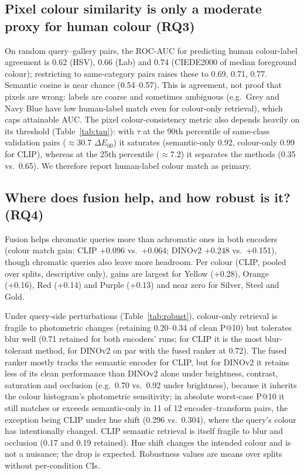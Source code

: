 \documentclass[11pt]{article}
\begin{document}
\subsection{Pixel colour similarity is only a moderate proxy for human colour (RQ3)}\label{sec:metric}

On random query--gallery pairs, the ROC-AUC for predicting human colour-label agreement is 0.62 (HSV), 0.66 (Lab) and 0.74 (CIEDE2000 of median foreground colour); restricting to same-category pairs raises these to 0.69, 0.71, 0.77. Semantic cosine is near chance (0.54--0.57). This is agreement, not proof that pixels are wrong: labels are coarse and sometimes ambiguous (e.g.\ Grey and Navy Blue have low human-label match even for colour-only retrieval), which caps attainable AUC. The pixel colour-consistency metric also depends heavily on its threshold (Table~\ref{tab:tau}): with $\tau$ at the 90th percentile of same-class validation pairs ($\approx$30.7 $\Delta E_{00}$) it saturates (semantic-only 0.92, colour-only 0.99 for CLIP), whereas at the 25th percentile ($\approx$7.2) it separates the methods (0.35 vs.\ 0.65). We therefore report human-label colour match as primary.


\subsection{Where does fusion help, and how robust is it? (RQ4)}

Fusion helps chromatic queries more than achromatic ones in both encoders (colour match gain: CLIP +0.096 vs.\ +0.064; DINOv2 +0.248 vs.\ +0.151), though chromatic queries also leave more headroom. Per colour (CLIP, pooled over splits, descriptive only), gains are largest for Yellow (+0.28), Orange (+0.16), Red (+0.14) and Purple (+0.13) and near zero for Silver, Steel and Gold.

Under query-side perturbations (Table~\ref{tab:robust}), colour-only retrieval is fragile to photometric changes (retaining 0.20--0.34 of clean P@10) but tolerates blur well (0.71 retained for both encoders' runs; for CLIP it is the most blur-tolerant method, for DINOv2 on par with the fused ranker at 0.72). The fused ranker mostly tracks the semantic encoder for CLIP, but for DINOv2 it retains less of its clean performance than DINOv2 alone under brightness, contrast, saturation and occlusion (e.g.\ 0.70 vs.\ 0.92 under brightness), because it inherits the colour histogram's photometric sensitivity; in absolute worst-case P@10 it still matches or exceeds semantic-only in 11 of 12 encoder--transform pairs, the exception being CLIP under hue shift (0.296 vs.\ 0.304), where the query's colour has intentionally changed. CLIP semantic retrieval is itself fragile to blur and occlusion (0.17 and 0.19 retained). Hue shift changes the intended colour and is not a nuisance; the drop is expected. Robustness values are means over splits without per-condition CIs.
\end{document}
